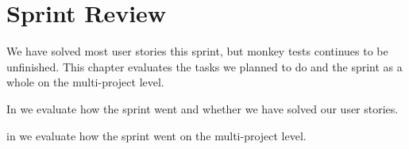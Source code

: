\chapter{Sprint Review}\label{chap:sprint2_end}
We have solved most user stories this sprint, but monkey tests continues to be unfinished. This chapter evaluates the tasks we planned to do and the sprint as a whole on the multi-project level.

\begin{chapterorganization}
  \item In  we evaluate how the sprint went and whether we have solved our user stories.
  \item in  we evaluate how the sprint went on the multi-project level.
\end{chapterorganization}

